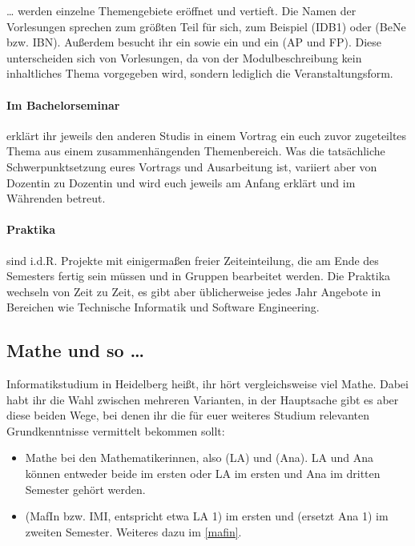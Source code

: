 \dots{} werden einzelne Themengebiete eröffnet und vertieft. Die Namen der Vorlesungen sprechen zum größten Teil für sich, zum Beispiel  (\gls{IDB1}) oder  (\gls{BeNe} bzw. IBN). Außerdem besucht ihr ein  sowie ein  und ein  (\gls{AP} und \gls{FP}). Diese unterscheiden sich von Vorlesungen, da von der Modulbeschreibung kein inhaltliches Thema vorgegeben wird, sondern lediglich die Veranstaltungsform.

\paragraph*{Im Bachelorseminar} erklärt ihr jeweils den anderen Studis in einem Vortrag ein euch zuvor zugeteiltes Thema aus einem zusammenhängenden Themenbereich. Was die tatsächliche Schwerpunktsetzung eures Vortrags und Ausarbeitung ist, variiert aber von Dozentin zu Dozentin und wird euch jeweils am Anfang erklärt und im Währenden betreut.

\paragraph*{Praktika} sind i.d.R. Projekte mit einigermaßen freier Zeiteinteilung, die am Ende des Semesters fertig sein müssen und in Gruppen bearbeitet werden. Die Praktika wechseln von Zeit zu Zeit, es gibt aber üblicherweise jedes Jahr Angebote in Bereichen wie Technische Informatik und Software Engineering.

\subsection{Mathe und so \dots}

Informatikstudium in Heidelberg heißt, ihr hört vergleichsweise viel Mathe. Dabei habt ihr die Wahl zwischen mehreren Varianten, in der Hauptsache gibt es aber diese beiden Wege, bei denen ihr die für euer weiteres Studium relevanten Grundkenntnisse vermittelt bekommen sollt:

\begin{itemize}
    \item Mathe bei den Mathematikerinnen, also  (\gls{LA}) und  (\gls{Ana}). \gls{LA} und \gls{Ana} können entweder beide im ersten oder \gls{LA} im ersten und \gls{Ana} im dritten Semester gehört werden.
    \item {} (\gls{MafIn} bzw. IMI, entspricht etwa \gls{LA} 1) im ersten und  (ersetzt \gls{Ana} 1) im zweiten Semester. Weiteres dazu im \autoref{mafin}.
\end{itemize}

